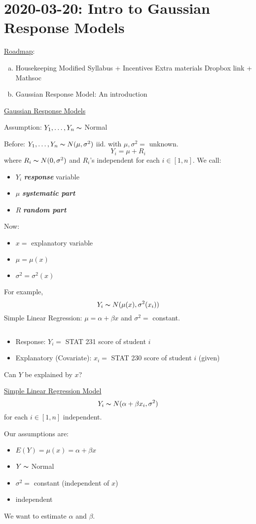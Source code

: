 \section{2020-03-20: Intro to Gaussian Response Models}
\underline{Roadmap}:
\begin{enumerate}[(a)]
    \item Housekeeping
          \subitem Modified Syllabus + Incentives
          \subitem Extra materials
          \subitem Dropbox link + Mathsoc
    \item Gaussian Response Model: An introduction
\end{enumerate}
\underline{Gaussian Response Models}

Assumption: $ Y_1,\ldots ,Y_n \thicksim $ Normal

Before: $ Y_1,\ldots ,Y_n \thicksim N(\mu,\sigma^2) $ iid.
with $ \mu,\sigma^2= $ unknown.
\[ Y_i=\mu+R_i \]
where $ R_i \thicksim N(0,\sigma^2) $ and $ R_i $'s independent
for each $ i\in[1,n] $. We call:
\begin{itemize}
    \item $ Y_i $ \textbf{\emph{response}} variable
    \item $ \mu $ \textbf{\emph{systematic part}}
    \item $ R $ \textbf{\emph{random part}}
\end{itemize}

Now:
\begin{itemize}
    \item $ x= $ explanatory variable
    \item $ \mu=\mu(x) $
    \item $ \sigma^2=\sigma^2(x) $
\end{itemize}
For example,
\[ Y_i \thicksim N(\mu(x),\sigma^2(x_i)) \]
Simple Linear Regression: $ \mu=\alpha+\beta x $
and $ \sigma^2 = $ constant.

\begin{exbox}
    \begin{example} $ \; $
        \begin{itemize}
            \item Response: $ Y_i= $ STAT 231 score of student $ i $
            \item Explanatory (Covariate): $ x_i= $ STAT 230 score of student $ i $
                  (given)
        \end{itemize}
        Can $ Y $ be explained by $ x $?

        \underline{Simple Linear Regression Model}
        \[ Y_i \thicksim N(\alpha+\beta x_i,\sigma^2) \]
        for each $ i\in[1,n] $ independent.

        Our assumptions are:
        \begin{itemize}
            \item $ E(Y)=\mu(x)=\alpha+\beta x $
            \item $ Y \thicksim $ Normal
            \item $ \sigma^2= $ constant (independent of $ x $)
            \item independent
        \end{itemize}
        We want to estimate $ \alpha $ and $ \beta $.
    \end{example}
\end{exbox}
